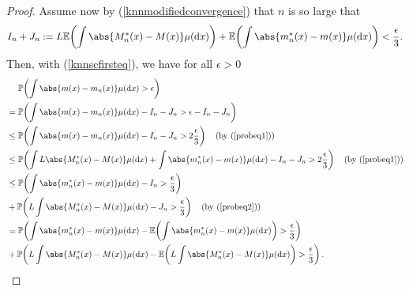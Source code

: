 \begin{proof}
    Assume now by (\ref{knnmodifiedconvergence}) that \(n\) is so large that
    \[
        I_n + J_n := L\ev{\int \abs{M_n^*(x) - M(x)} \mu(\dx)} + \ev{\int \abs{m_n^*(x) - m(x)} \mu(\dx)} < \frac{\epsilon}{3}.
    \]
    Then, with (\ref{knnscfirsteq}), we have for all \(\epsilon > 0\)
    \begin{align}
        &\quad \ \pro{\int \abs{m(x) - m_n(x)} \mu(\dx) > \epsilon} \\
        &= \pro{\int \abs{m(x) - m_n(x)} \mu(\dx) - I_n - J_n > \epsilon - I_n - J_n} \nonumber \\
        &\leq \pro{\int \abs{m(x) - m_n(x)} \mu(\dx) - I_n - J_n > 2\frac{\epsilon}{3}} \quad \text{(by (\ref{probeq1}))}\nonumber \\
        &\leq \pro{\int L\abs{M_n^*(x) - M(x)} \mu(\dx) + \int \abs{m_n^*(x) - m(x)} \mu(\dx) - I_n - J_n > 2\frac{\epsilon}{3}} \quad \text{(by (\ref{probeq1}))} \nonumber \\
        &\leq \pro{\int \abs{m_n^*(x) - m(x)} \mu(\dx) - I_n  > \frac{\epsilon}{3}} \nonumber  \\
        &+ \pro{L\int \abs{M_n^*(x) - M(x)} \mu(\dx) - J_n > \frac{\epsilon}{3}} \quad \text{(by (\ref{probeq2}))}\nonumber \\
        &= \pro{\int \abs{m_n^*(x) - m(x)} \mu(\dx) - \ev{\int \abs{m_n^*(x) - m(x)} \mu(\dx)}  > \frac{\epsilon}{3}} \nonumber \\
        &+ \pro{L\int \abs{M_n^*(x) - M(x)} \mu(\dx) - \ev{L\int \abs{M_n^*(x) - M(x)} \mu(\dx)}  > \frac{\epsilon}{3}}  \nonumber.
    \end{align}


\end{proof}
